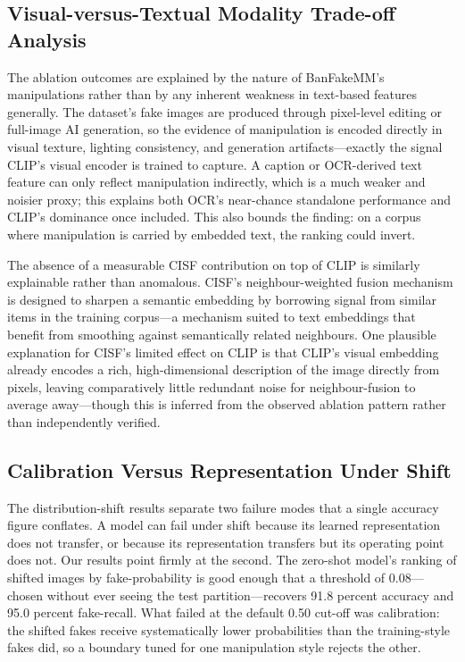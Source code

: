 \documentclass[conference,a4paper]{IEEEtran}
\begin{document}
\subsection{Visual-versus-Textual Modality Trade-off Analysis}

The ablation outcomes are explained by the nature of BanFakeMM's manipulations
rather than by any inherent weakness in text-based features generally. The
dataset's fake images are produced through pixel-level editing or full-image
AI generation, so the evidence of manipulation is encoded directly in visual
texture, lighting consistency, and generation artifacts---exactly the signal
CLIP's visual encoder is trained to capture. A caption or OCR-derived text
feature can only reflect manipulation indirectly, which is a much weaker and
noisier proxy; this explains both OCR's near-chance standalone performance and
CLIP's dominance once included. This also bounds the finding: on a corpus
where manipulation is carried by embedded text, the ranking could invert.

The absence of a measurable CISF contribution on top of CLIP is similarly
explainable rather than anomalous. CISF's neighbour-weighted fusion mechanism
is designed to sharpen a semantic embedding by borrowing signal from similar
items in the training corpus---a mechanism suited to text embeddings that
benefit from smoothing against semantically related neighbours. One plausible
explanation for CISF's limited effect on CLIP is that CLIP's visual embedding
already encodes a rich, high-dimensional description of the image directly
from pixels, leaving comparatively little redundant noise for neighbour-fusion
to average away---though this is inferred from the observed ablation pattern
rather than independently verified.

\subsection{Calibration Versus Representation Under Shift}

The distribution-shift results separate two failure modes that a single
accuracy figure conflates. A model can fail under shift because its learned
representation does not transfer, or because its representation transfers but
its operating point does not. Our results point firmly at the second. The
zero-shot model's ranking of shifted images by fake-probability is good enough
that a threshold of 0.08---chosen without ever seeing the test
partition---recovers 91.8 percent accuracy and 95.0 percent fake-recall.
What failed at the default 0.50 cut-off was calibration: the shifted fakes
receive systematically lower probabilities than the training-style fakes did,
so a boundary tuned for one manipulation style rejects the other.
\end{document}
